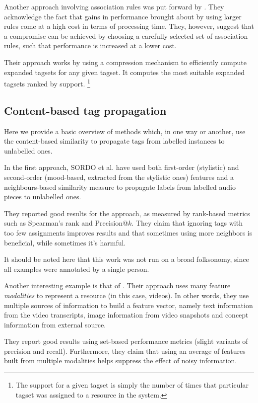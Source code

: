 Another approach involving association rules was put forward by \cite{vanleeuwen_puspitaningrum_2012}. They acknowledge the fact that gains in performance brought about by using larger rules come at a high cost in terms of processing time. They, however, suggest that a compromise can be achieved by choosing a carefully selected set of association rules, such that performance is increased at a lower cost.

Their approach works by using a compression mechanism to efficiently compute expanded tagsets for any given tagset. It computes the most suitable expanded tagsets ranked by support. \footnote{The support for a given tagset is simply the number of times that particular tagset was assigned to a resource in the system.}

\subsection{Content-based tag propagation}

Here we provide a basic overview of methods which, in one way or another, use the content-based similarity to propagate tags from labelled instances to unlabelled ones.

In the first approach, SORDO et al. \citeyearpar{sordo_etal_2007} have used both first-order (stylistic) and second-order (mood-based, extracted from the stylistic ones) features and a neighbours-based similarity measure to propagate labels from labelled audio pieces to unlabelled ones.

They reported good results for the approach, as measured by rank-based metrics such as Spearman's rank and Precision@$k$. They claim that ignoring tags with too few assignments improves results and that sometimes using more neighbors is beneficial, while sometimes it's harmful.

It should be noted here that this work was not run on a broad folksonomy, since all examples were annotated by a single person.

Another interesting example is that of \cite{moxley_etal_2008}. Their approach uses many feature \textit{modalities} to represent a resource (in this case, videos). In other words, they use multiple sources of information to build a feature vector, namely text information from the video transcripts, image information from video snapshots and concept information from external source.

They report good results using set-based performance metrics (slight variants of precision and recall). Furthermore, they claim that using an average of features built from multiple modalities helps suppress the effect of noisy information.

